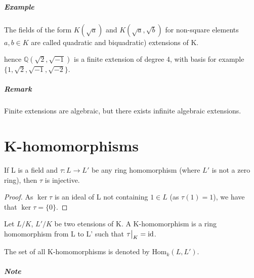 \subparagraph{Example}

The fields of the form $K(\sqrt{a})$ and $K(\sqrt{a}, \sqrt{b})$ for non-square elements $a, b \in K$ are called quadratic and biquadratic) extensions of K.
\begin{figure}[H]
  \centering
{}
\end{figure}
hence $\mathbb{Q}(\sqrt{2}, \sqrt{-1})$ is a finite extension of degree 4, with basis for example $\{1, \sqrt{2}, \sqrt{-1}, \sqrt{-2}\}$.

\subparagraph{Remark}
Finite extensions are algebraic, but there exists infinite algebraic extensions.

\section{K-homomorphisms}

\begin{lemma}
  If L is a field and $\tau : L \rightarrow L'$ be any ring homomorphism (where $L'$ is not a zero ring), then $\tau$ is injective.
\end{lemma}

\begin{proof}
  As $\ker \tau$ is an ideal of L not containing $1 \in L$ (as $\tau(1) = 1$), we have that $\ker \tau = \{0\}$.
\end{proof}

\begin{definition}
  Let $L/K$, $L'/K$ be two etensions of K. A K-homomorphism is a ring homomorphism from L to L' such that $\restr{\tau}{K} = \text{id}$. 

  The set of all K-homomorphisms is denoted by $\text{Hom}_k\left(L, L'\right)$.
\end{definition}

\subparagraph{Note}

